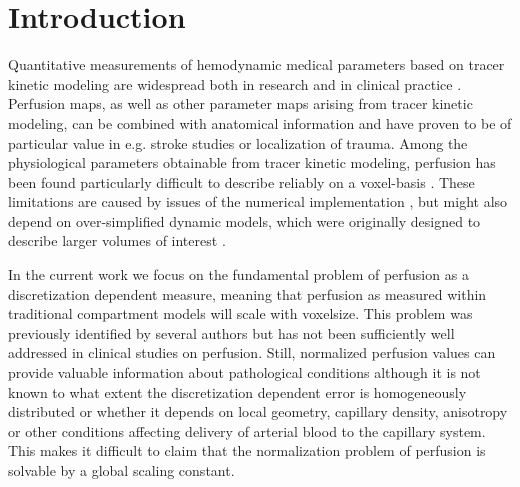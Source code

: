 \documentclass[final,5p,times,twocolumn]{elsarticle}
\begin{document}
\section{Introduction}
	Quantitative measurements of hemodynamic medical parameters based on tracer kinetic modeling are widespread both in research and in clinical practice \cite{sourbron13,Feng2013,Chen2011}. 
	Perfusion maps, as well as other parameter maps arising from tracer kinetic modeling, can be combined with anatomical information and have proven to be of particular value in e.g. stroke studies or localization of trauma.
	Among the physiological parameters obtainable from tracer kinetic modeling, perfusion has been found particularly difficult to describe reliably on a voxel-basis \cite{kudo10}.
	These limitations are caused by issues of the numerical implementation \cite{kudo10}, but might also depend on over-simplified dynamic models, which were originally designed to describe larger volumes of interest \cite{zierler00}.	
	
In the current work we focus on the fundamental problem of perfusion as a discretization dependent measure, meaning that perfusion as measured within traditional compartment models will scale with voxelsize. This problem was previously identified by several authors \cite{Henkelman1990,Guibert2013,sourbron14} but has not been sufficiently well addressed in clinical studies on perfusion. Still, normalized perfusion values can provide valuable information about pathological conditions although it is not known to what extent the discretization dependent error is homogeneously distributed or whether it depends on local geometry, capillary density, anisotropy or other conditions affecting delivery of arterial blood to the capillary system. This makes it difficult to claim that the normalization problem of perfusion is solvable by a global scaling constant.
\end{document}
